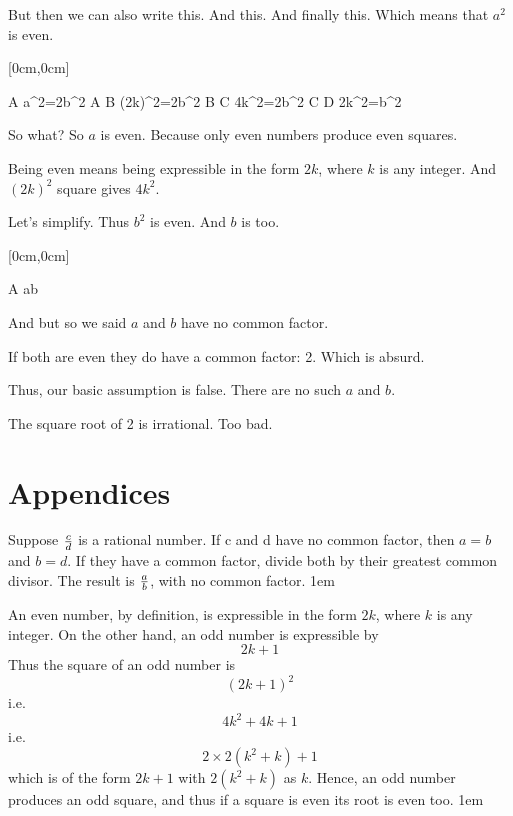 \Step[B] But then we can also write this.
\step[C] And this.
\step[D] And finally this.
\step Which means that $a^2$ is even.

\endslide




\step[on=A][0cm,0cm]{}

\Domath A   {a^2=2b^2}
\domath A B {(2k)^2=2b^2}
\domath B C {4k^2=2b^2}
\domath C D {2k^2=b^2}

\Step[visible=true] So what?
\step So $a$ is even. Because only even numbers produce even squares.

\Step[A] Being even means being expressible in the form $2k$, where $k$ is
any integer.
\step[B] And $(2k)^2$ square gives $4k^2$.

\Step[C] Let's simplify.
\step Thus $b^2$ is even.
\step And $b$ is too.

\endslide




\step[on=A][0cm,0cm]{}

\domath A {} {{a\over b}\neq{}}

\Step[visible=true] And but so we said $a$ and $b$ have no common factor.

\Step If both are even they do have a common factor: 2.
\step Which is absurd.

\Step Thus, our basic assumption is false.
\step[A] There are no such $a$ and $b$.

\Step The square root of 2 is irrational.
\step Too bad.

\endslide





\section{Appendices}




\Step[visible=true]
Suppose $c\over d$ is a rational number. If c and d have no common
factor, then $a=b$ and $b=d$. If they have a common factor,
divide both by their greatest common divisor. The result
is $a\over b$, with no common factor.
\kern1em

\endappslide




\Step[visible=true]
An even number, by definition, is expressible
in the form $2k$, where $k$ is any integer.
On the other hand, an odd number is expressible by
%
$$2k+1$$
%
Thus the square of an odd number is
%
$$(2k+1)^2$$
i.e. $$4k^2+4k+1$$
i.e. $$2\times2(k^2+k)+1$$
%
which is of the form $2k+1$
with $2(k^2+k)$ as $k$.
Hence, an odd number produces an odd square,
and thus if a square is even its root is even too.
\kern1em

\endappslide


\bye